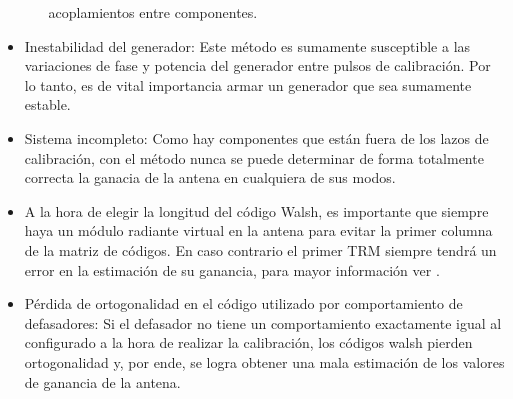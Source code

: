 \begin{itemize}
\begin{itemize}
			acoplamientos entre componentes.
	\end{itemize}
	\item Inestabilidad del generador: Este método es sumamente susceptible a las variaciones de fase y potencia del generador 
		entre pulsos de calibración. Por lo tanto, es de vital importancia armar un generador que sea sumamente estable.
	\item Sistema incompleto: Como hay componentes que están fuera de los lazos de calibración, con el método nunca se puede 
		determinar de forma totalmente correcta la ganacia de la antena en cualquiera de sus modos.
	\item A la hora de elegir la longitud del código Walsh, es importante que siempre haya un módulo radiante virtual en la 
		antena para evitar la primer columna de la matriz de códigos. En caso contrario el primer TRM siempre tendrá un error en 
		la estimación de su ganancia, para mayor información ver \cite{Wang2010}.
	\item Pérdida de ortogonalidad en el código utilizado por comportamiento de defasadores: Si el defasador no tiene un 
		comportamiento exactamente igual al configurado a la hora de realizar la calibración, los códigos walsh pierden 
		ortogonalidad y, por ende, se logra obtener una mala estimación de los valores de ganancia de la antena. 
\end{itemize}

